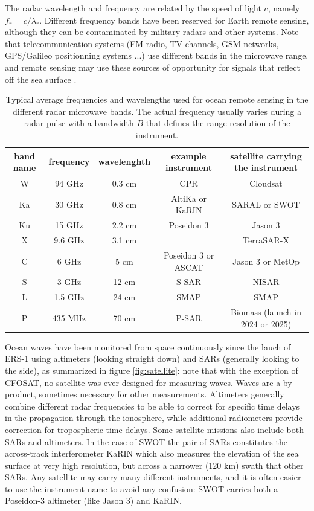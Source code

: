 The radar wavelength 
and frequency are related by the speed of light $c$, namely $f_r = c / \lambda_r$. Different frequency bands have been reserved for Earth remote sensing, although they can be contaminated by military radars and other 
systems. Note that telecommunication systems (FM radio, TV channels, GSM networks, GPS/Galileo positionning systems ...) use different bands in the microwave range, and remote sensing may use these sources of opportunity for signals that reflect off the sea surface  \citep[e.g.][]{Lowe&al.2002}.
\begin{table}[hb]
  \centering
  \begin{tabular}{|c|c|c|c| c |}
 \hline
band name & frequency & wavelenghth & example instrument & satellite  carrying the instrument  \\
 \hline
W  & 94 GHz  & 0.3 cm & CPR & Cloudsat  \\
Ka & 30 GHz  & 0.8 cm & AltiKa or KaRIN & SARAL or SWOT  \\
Ku & 15 GHz  & 2.2 cm & Poseidon 3 & Jason 3  \\
X &  9.6 GHz & 3.1 cm & & TerraSAR-X  \\
C & 6 GHz   & 5 cm & Poseidon 3 or ASCAT & Jason 3 or MetOp \\
S & 3 GHz   & 12 cm & S-SAR &  NISAR \\
L & 1.5 GHz  & 24 cm & SMAP  & SMAP \\
P & 435 MHz  & 70 cm & P-SAR & Biomass (launch  in 2024 or 2025) \\
\hline
\end{tabular}
\caption{Typical average frequencies and wavelengths used for ocean remote sensing in the different radar microwave bands. The actual frequency usually varies during a radar pulse with a bandwidth $B$ that defines 
the range resolution of the instrument. \label{table_radars}}
\label{table_bands}
\end{table}
Ocean waves have been monitored from space continuously since the lauch of ERS-1 using altimeters (looking straight down)  and SARs (generally looking to the side), as summarized in figure \ref{fig:satellite}: note that with the exception of CFOSAT, no satellite was ever designed for measuring waves. Waves are a by-product, sometimes necessary for other measurements. Altimeters generally combine different radar frequencies to be able to correct for specific time delays in the propagation through the ionosphere, while additional radiometers provide correction for tropospheric time delays.  Some satellite missions also include both SARs and altimeters. In the case of SWOT the pair of SARs constitutes the across-track interferometer KaRIN which also measures the elevation of the sea surface at very high resolution, but across a narrower (120 km) swath that other SARs. Any satellite may carry many different instruments, and it is often easier to use the instrument name to avoid any confusion: SWOT carries both a Poseidon-3 altimeter (like Jason 3) and KaRIN. 

